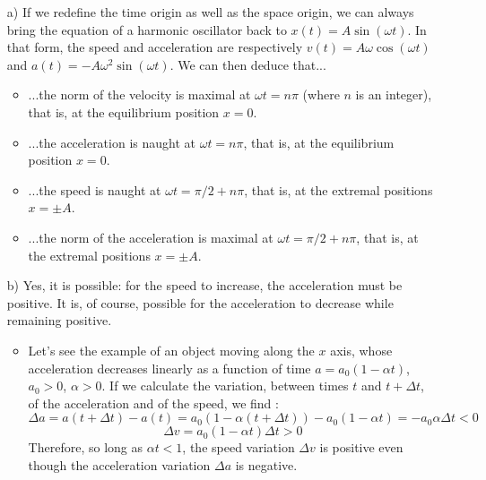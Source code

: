 %
%

\begin{center}
\vspace*{5mm}
\end{center}


\begin{enumerate}
\item[a)] If we redefine the time origin as well as the space origin, we can always bring the equation of a harmonic oscillator back to $x(t)=A\sin(\omega t)$. In that form, the speed and acceleration are respectively $v(t)=A\omega \cos(\omega t)$ and $a(t)=-A\omega^2\sin(\omega t)$. We can then deduce that...
\begin{itemize}
\item ...the norm of the velocity is maximal at $\omega t=n\pi$ (where $n$ is an integer), that is, at the equilibrium position $x=0$.
\item ...the acceleration is naught at  $\omega t=n\pi$, that is, at the equilibrium position $x=0$.
\item ...the speed is naught at $\omega t=\pi/2+n\pi$, that is, at the extremal positions $x=\pm A$. 
\item ...the norm of the acceleration is maximal at $\omega t=\pi/2+n\pi$, that is, at the extremal positions $x=\pm A$. 
\end{itemize}
\item[b)] Yes, it is possible: for the speed to increase, the acceleration must be positive. It is, of course, possible for the acceleration to decrease while remaining positive. 
\begin{itemize}
\item Let's see the example of an object moving along the $x$ axis, whose acceleration decreases linearly as a function of time $a=a_0(1-\alpha t)$, $a_0>0$, $\alpha >0$. If we calculate the variation, between times $t$ and   $t+\Delta t$, of the acceleration and of the speed, we find :
$$\Delta a=a(t+\Delta t)-a(t)=a_0(1-\alpha(t+\Delta t))-a_0(1-\alpha t)=-a_0 \alpha \Delta t <0$$
$$
\Delta v=a_0 (1-\alpha t)\Delta t >0  
$$
Therefore, so long as $\alpha t<1$, the speed variation $\Delta v$ is positive even though the acceleration variation $\Delta a$ is negative.


\end{itemize}
\end{enumerate}
